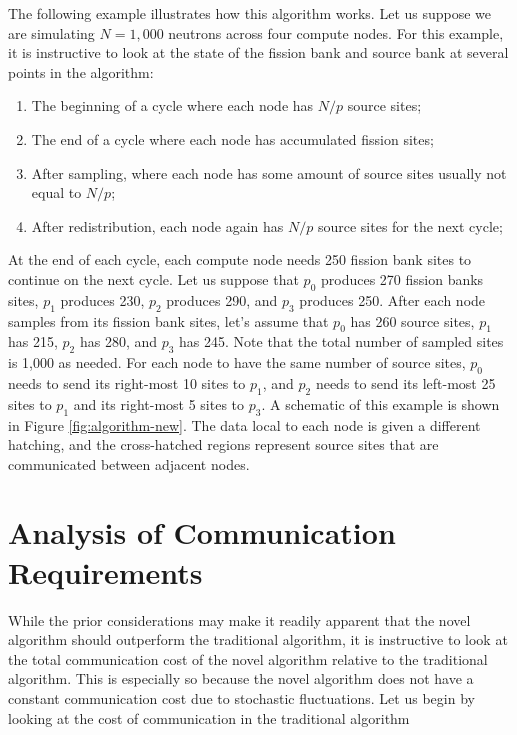 \documentclass[11pt]{article}
\begin{document}
The following example illustrates how this algorithm works. Let us
suppose we are simulating $N = 1,000$ neutrons across four compute
nodes. For this example, it is instructive to look at the state of the
fission bank and source bank at several points in the algorithm:
\begin{enumerate}
\item The beginning of a cycle where each node has $N/p$ source sites;
\item The end of a cycle where each node has accumulated fission sites;
\item After sampling, where each node has some amount of source sites
  usually not equal to $N/p$;
\item After redistribution, each node again has $N/p$ source sites for
  the next cycle;
\end{enumerate}

At the end of each cycle, each compute node needs 250 fission bank
sites to continue on the next cycle. Let us suppose that $p_0$
produces 270 fission banks sites, $p_1$ produces 230, $p_2$ produces
290, and $p_3$ produces 250. After each node samples from its fission
bank sites, let's assume that $p_0$ has 260 source sites, $p_1$ has
215, $p_2$ has 280, and $p_3$ has 245. Note that the total number of
sampled sites is 1,000 as needed. For each node to have the same number
of source sites, $p_0$ needs to send its right-most 10 sites to $p_1$,
and $p_2$ needs to send its left-most 25 sites to $p_1$ and its
right-most 5 sites to $p_3$. A schematic of this example is shown in
Figure \ref{fig:algorithm-new}. The data local to each node is given a
different hatching, and the cross-hatched regions represent source
sites that are communicated between adjacent nodes.

\section{Analysis of Communication Requirements}
\label{sec:analysis}

While the prior considerations may make it readily apparent that the
novel algorithm should outperform the traditional algorithm, it is
instructive to look at the total communication cost of the novel
algorithm relative to the traditional algorithm. This is especially so
because the novel algorithm does not have a constant communication
cost due to stochastic fluctuations. Let us begin by looking at the
cost of communication in the traditional algorithm
\end{document}
